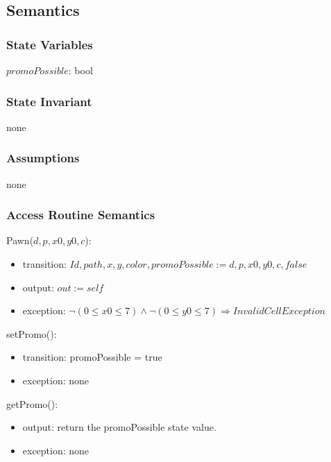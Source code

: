 \documentclass[12pt]{article}
\begin{document}
\subsection* {Semantics}

\subsubsection* {State Variables}

$promoPossible$: bool

\subsubsection* {State Invariant}

none

\subsubsection* {Assumptions}

none

\subsubsection* {Access Routine Semantics}

Pawn($d, p, x0, y0, c$):
\begin{itemize}
\item transition: $Id, path, x, y, color, promoPossible := d, p, x0, y0, c, false$
\item output: $out := \mathit{self}$
\item exception: $ \neg (0 \leq x0 \leq 7) \wedge  \neg (0 \leq y0 \leq 7) \Rightarrow InvalidCellException$
\end{itemize}

\noindent setPromo():
\begin{itemize}
\item transition: promoPossible = true
\item exception: none
\end{itemize}

\noindent getPromo():
\begin{itemize}
\item output: return the promoPossible state value.
\item exception: none
\end{itemize}
\end{document}
